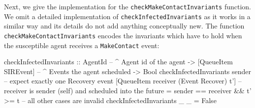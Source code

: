 Next, we give the implementation for the \texttt{checkMakeContactInvariants} function. We omit a detailed implementation of \texttt{checkInfectedInvariants} as it works in a similar way and its details do not add anything conceptually new. The function \texttt{checkMakeContactInvariants} encodes the invariants which have to hold when the susceptible agent receives a \texttt{MakeContact} event:

\begin{HaskellCode}
checkInfectedInvariants :: AgentId              -- ^ Agent id of the agent 
                        -> [QueueItem SIREvent] -- ^ Events the agent scheduled
                        -> Bool
checkInfectedInvariants sender 
  -- expect exactly one Recovery event
  [QueueItem receiver (Event Recover) t'] 
  -- receiver is sender (self) and scheduled into the future
  = sender == receiver && t' >= t 
-- all other cases are invalid
checkInfectedInvariants _ _ = False
\end{HaskellCode}

%
%

